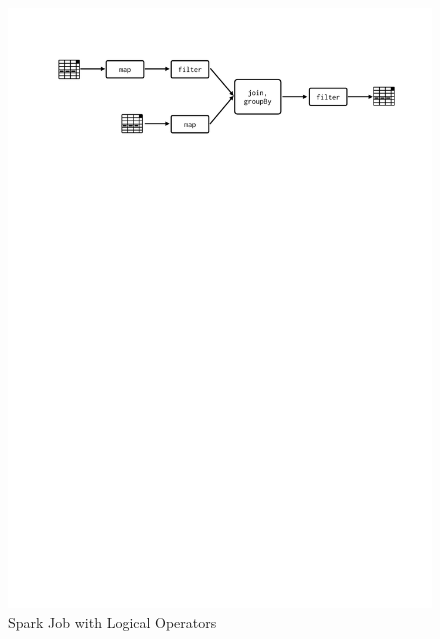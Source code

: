 \begin{figure}[h!]
    \centering
    \includegraphics[clip,trim=2.3cm 23.5cm 1.7cm 2.5cm,scale=0.97]{stage-logical.pdf}
    \caption[Spark Job with Logical Operators]{Spark Job with Logical Operators}
    \label{fig:sp:logical}

\end{figure}
